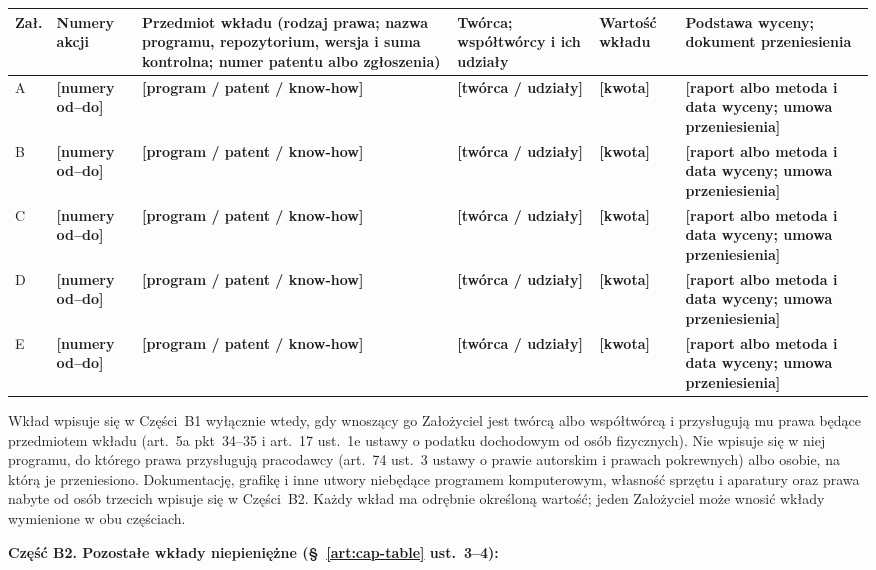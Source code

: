 \documentclass[12pt,a4paper]{report}
\newcommand{\field}[1]{\textbf{[#1]}}
\begin{document}
\begin{center}
\begin{tabularx}{\linewidth}{@{}p{0.9cm} p{2.0cm} >{\raggedright\arraybackslash}X >{\raggedright\arraybackslash}p{2.4cm} p{1.7cm} >{\raggedright\arraybackslash}p{2.6cm}@{}}
\toprule
\textbf{Zał.} & \textbf{Numery akcji} & \textbf{Przedmiot wkładu (rodzaj prawa; nazwa programu, repozytorium, wersja i suma kontrolna; numer patentu albo zgłoszenia)} & \textbf{Twórca; współtwórcy i ich udziały} & \textbf{Wartość wkładu} & \textbf{Podstawa wyceny; dokument przeniesienia} \\
\midrule
A & \field{numery od--do} & \field{program / patent / know-how} & \field{twórca / udziały} & \field{kwota} & \field{raport albo metoda i data wyceny; umowa przeniesienia} \\
B & \field{numery od--do} & \field{program / patent / know-how} & \field{twórca / udziały} & \field{kwota} & \field{raport albo metoda i data wyceny; umowa przeniesienia} \\
C & \field{numery od--do} & \field{program / patent / know-how} & \field{twórca / udziały} & \field{kwota} & \field{raport albo metoda i data wyceny; umowa przeniesienia} \\
D & \field{numery od--do} & \field{program / patent / know-how} & \field{twórca / udziały} & \field{kwota} & \field{raport albo metoda i data wyceny; umowa przeniesienia} \\
E & \field{numery od--do} & \field{program / patent / know-how} & \field{twórca / udziały} & \field{kwota} & \field{raport albo metoda i data wyceny; umowa przeniesienia} \\
\bottomrule
\end{tabularx}
\end{center}

Wkład wpisuje się w Części~B1 wyłącznie wtedy, gdy wnoszący go Założyciel jest twórcą albo współtwórcą i przysługują mu prawa będące przedmiotem wkładu (art.~5a pkt~34--35 i art.~17 ust.~1e ustawy o podatku dochodowym od osób fizycznych). Nie wpisuje się w niej programu, do którego prawa przysługują pracodawcy (art.~74 ust.~3 ustawy o prawie autorskim i prawach pokrewnych) albo osobie, na którą je przeniesiono. Dokumentację, grafikę i inne utwory niebędące programem komputerowym, własność sprzętu i aparatury oraz prawa nabyte od osób trzecich wpisuje się w Części~B2. Każdy wkład ma odrębnie określoną wartość; jeden Założyciel może wnosić wkłady wymienione w obu częściach.

\textbf{Część B2. Pozostałe wkłady niepieniężne (§~\ref{art:cap-table} ust.~3--4):}
\end{document}
